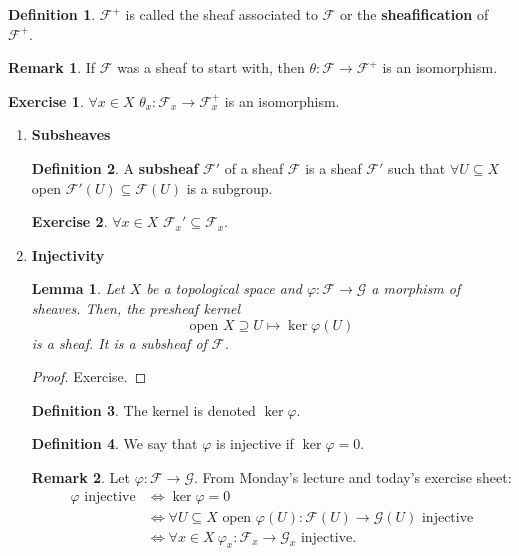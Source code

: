 \documentclass[12pt]{article}
\newtheorem*{lemma}{Lemma}
\theoremstyle{definition}
\newtheorem*{definition}{Definition}
\newtheorem*{remark}{Remark}
\newtheorem*{exercise}{Exercise}
\theoremstyle{remark}
\begin{document}
\begin{definition}
$\mathcal{F}^+$ is called the sheaf associated to $\mathcal{F}$ or the \textbf{sheafification} of $\mathcal{F}^+$.
\end{definition}

\begin{remark}
If $\mathcal{F}$ was a sheaf to start with, then $\theta:\mathcal{F}\rightarrow\mathcal{F}^+$ is an isomorphism.
\end{remark}

\begin{exercise}
$\forall x\in X$ $\theta_x:\mathcal{F}_x\rightarrow\mathcal{F}^+_x$ is an isomorphism.
\end{exercise}

\begin{enumerate}[label=\arabic*)]
\item \textbf{Subsheaves}
\begin{definition}
A \textbf{subsheaf} $\mathcal{F}'$ of a sheaf $\mathcal{F}$ is a sheaf $\mathcal{F}'$ such that $\forall U\subseteq X$ open $\mathcal{F}'(U)\subseteq\mathcal{F}(U)$ is a subgroup.
\end{definition}

\begin{exercise}
$\forall x\in X$ $\mathcal{F}_x'\subseteq\mathcal{F}_x$.
\end{exercise}

\item \textbf{Injectivity}
\begin{lemma}
Let $X$ be a topological space and $\varphi:\mathcal{F}\rightarrow\mathcal{G}$ a morphism of sheaves. Then, the presheaf kernel
\[\text{open }X\supseteq U\longmapsto\ker\varphi(U)\]
is a sheaf. It is a subsheaf of $\mathcal{F}$.
\end{lemma}

\begin{proof}
Exercise.
\end{proof}

\begin{definition}
The kernel is denoted $\ker\varphi$.
\end{definition}

\begin{definition}
We say that $\varphi$ is injective if $\ker\varphi=0$.
\end{definition}

\begin{remark}
Let $\varphi:\mathcal{F}\rightarrow\mathcal{G}$. From Monday's lecture and today's exercise sheet:
\begin{align*}
\varphi\text{ injective}&\Longleftrightarrow\ker\varphi=0\\
&\Longleftrightarrow\forall U\subseteq X\text{ open }\varphi(U):\mathcal{F}(U)\rightarrow\mathcal{G}(U)\text{ injective}\\
&\Longleftrightarrow\forall x\in X\ \varphi_x:\mathcal{F}_x\rightarrow\mathcal{G}_x\text{ injective}.
\end{align*}
\end{remark}


\end{enumerate}
\end{document}
